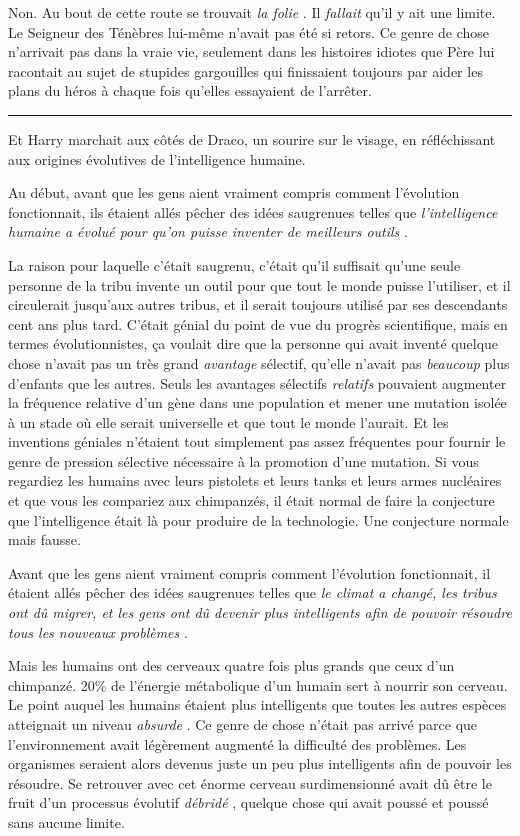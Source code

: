Non. Au bout de cette route se trouvait \emph{la folie} . Il \emph{fallait}  qu'il y ait une limite. Le Seigneur des Ténèbres lui-même n'avait pas été si retors. Ce genre de chose n'arrivait pas dans la vraie vie, seulement dans les histoires idiotes que Père lui racontait au sujet de stupides gargouilles qui finissaient toujours par aider les plans du héros à chaque fois qu'elles essayaient de l'arrêter.
\par\noindent\rule{\textwidth}{0.4pt}
Et Harry marchait aux côtés de Draco, un sourire sur le visage, en réfléchissant aux origines évolutives de l'intelligence humaine.

Au début, avant que les gens aient vraiment compris comment l'évolution fonctionnait, ils étaient allés pêcher des idées saugrenues telles que \emph{l'intelligence humaine a évolué pour qu'on puisse inventer de meilleurs outils} .

La raison pour laquelle c'était saugrenu, c'était qu'il suffisait qu'une seule personne de la tribu invente un outil pour que tout le monde puisse l'utiliser, et il circulerait jusqu'aux autres tribus, et il serait toujours utilisé par ses descendants cent ans plus tard. C'était génial du point de vue du progrès scientifique, mais en termes évolutionnistes, ça voulait dire que la personne qui avait inventé quelque chose n'avait pas un très grand \emph{avantage}  sélectif, qu'elle n'avait pas \emph{beaucoup}  plus d'enfants que les autres. Seuls les avantages sélectifs \emph{relatifs}  pouvaient augmenter la fréquence relative d'un gène dans une population et mener une mutation isolée à un stade où elle serait universelle et que tout le monde l'aurait. Et les inventions géniales n'étaient tout simplement pas assez fréquentes pour fournir le genre de pression sélective nécessaire à la promotion d'une mutation. Si vous regardiez les humains avec leurs pistolets et leurs tanks et leurs armes nucléaires et que vous les compariez aux chimpanzés, il était normal de faire la conjecture que l'intelligence était là pour produire de la technologie. Une conjecture normale mais fausse.

Avant que les gens aient vraiment compris comment l'évolution fonctionnait, il étaient allés pêcher des idées saugrenues telles que \emph{le climat a changé, les tribus ont dû migrer, et les gens ont dû devenir plus intelligents afin de pouvoir résoudre tous les nouveaux problèmes} .

Mais les humains ont des cerveaux quatre fois plus grands que ceux d'un chimpanzé. 20\% de l'énergie métabolique d'un humain sert à nourrir son cerveau. Le point auquel les humains étaient plus intelligents que toutes les autres espèces atteignait un niveau \emph{absurde} . Ce genre de chose n'était pas arrivé parce que l'environnement avait légèrement augmenté la difficulté des problèmes. Les organismes seraient alors devenus juste un peu plus intelligents afin de pouvoir les résoudre. Se retrouver avec cet énorme cerveau surdimensionné avait dû être le fruit d'un processus évolutif \emph{débridé} , quelque chose qui avait poussé et poussé sans aucune limite.

